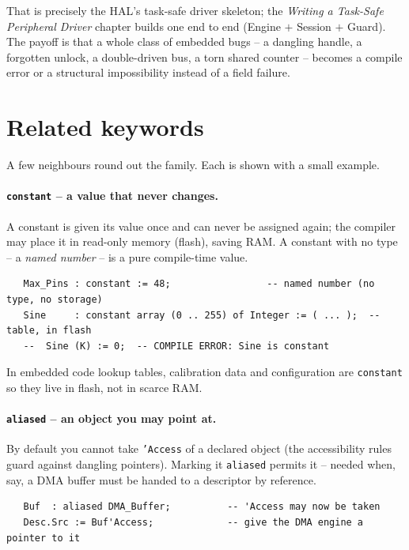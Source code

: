 That is precisely the HAL's task-safe driver skeleton; the \emph{Writing a
Task-Safe Peripheral Driver} chapter builds one end to end (Engine $+$ Session
$+$ Guard). The payoff is that a whole class of embedded bugs -- a dangling
handle, a forgotten unlock, a double-driven bus, a torn shared counter -- becomes
a compile error or a structural impossibility instead of a field failure.

\section{Related keywords}

A few neighbours round out the family. Each is shown with a small example.

\paragraph{\texttt{constant} -- a value that never changes.} A constant is given
its value once and can never be assigned again; the compiler may place it in
read-only memory (flash), saving RAM. A constant with no type -- a \emph{named
number} -- is a pure compile-time value.

\begin{lstlisting}
   Max_Pins : constant := 48;                 -- named number (no type, no storage)
   Sine     : constant array (0 .. 255) of Integer := ( ... );  -- table, in flash
   --  Sine (K) := 0;  -- COMPILE ERROR: Sine is constant
\end{lstlisting}

In embedded code lookup tables, calibration data and configuration are
\texttt{constant} so they live in flash, not in scarce RAM.

\paragraph{\texttt{aliased} -- an object you may point at.} By default you cannot
take \texttt{'Access} of a declared object (the accessibility rules guard against
dangling pointers). Marking it \texttt{aliased} permits it -- needed when, say, a
DMA buffer must be handed to a descriptor by reference.

\begin{lstlisting}
   Buf  : aliased DMA_Buffer;          -- 'Access may now be taken
   Desc.Src := Buf'Access;             -- give the DMA engine a pointer to it
\end{lstlisting}

